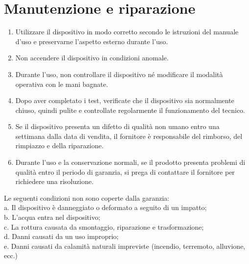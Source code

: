 \documentclass[a4paper]{article}
\begin{document}
\section{Manutenzione e riparazione}
\begin{enumerate}
  \item Utilizzare il dispositivo in modo corretto secondo le istruzioni del manuale d'uso e preservarne l'aspetto esterno durante l'uso.
  \item Non accendere il dispositivo in condizioni anomale.
  \item Durante l'uso, non controllare il dispositivo né modificare il modalità operativa con le mani bagnate.
  \item Dopo aver completato i test, verificate che il dispositivo sia normalmente chiuso, quindi pulite e controllate regolarmente il funzionamento del tecnico.
  \item Se il dispositivo presenta un difetto di qualità non umano entro una settimana dalla data di vendita, il fornitore è responsabile del rimborso, del rimpiazzo e della riparazione.
  \item Durante l'uso e la conservazione normali, se il prodotto presenta problemi di qualità entro il periodo di garanzia, si prega di contattare il fornitore per richiedere una risoluzione.
\end{enumerate}

Le seguenti condizioni non sono coperte dalla garanzia:\\
a. Il dispositivo è danneggiato o deformato a seguito di un impatto;\\
b. L'acqua entra nel dispositivo;\\
c. La rottura causata da smontaggio, riparazione e trasformazione;\\
d. Danni causati da un uso improprio;\\
e. Danni causati da calamità naturali impreviste (incendio, terremoto, alluvione, ecc.)
\end{document}
